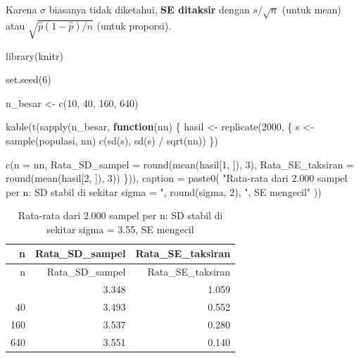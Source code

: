 \documentclass[
  indonesian,
  letterpaper,
]{book}
\newenvironment{Shaded}{\begin{snugshade}}{\end{snugshade}}
\newcommand{\AttributeTok}[1]{\textcolor[rgb]{0.40,0.45,0.13}{#1}}
\newcommand{\ControlFlowTok}[1]{\textcolor[rgb]{0.00,0.23,0.31}{\textbf{#1}}}
\newcommand{\DecValTok}[1]{\textcolor[rgb]{0.68,0.00,0.00}{#1}}
\newcommand{\FunctionTok}[1]{\textcolor[rgb]{0.28,0.35,0.67}{#1}}
\newcommand{\NormalTok}[1]{\textcolor[rgb]{0.00,0.23,0.31}{#1}}
\newcommand{\OtherTok}[1]{\textcolor[rgb]{0.00,0.23,0.31}{#1}}
\newcommand{\SpecialCharTok}[1]{\textcolor[rgb]{0.37,0.37,0.37}{#1}}
\newcommand{\StringTok}[1]{\textcolor[rgb]{0.13,0.47,0.30}{#1}}
\begin{document}
Karena \(\sigma\) biasanya tidak diketahui, \textbf{SE ditaksir} dengan
\(s/\sqrt{n}\) (untuk mean) atau \(\sqrt{\hat{p}(1-\hat{p})/n}\) (untuk
proporsi).

\begin{Shaded}
\begin{Highlighting}[]
\FunctionTok{library}\NormalTok{(knitr)}

\FunctionTok{set.seed}\NormalTok{(}\DecValTok{6}\NormalTok{)}

\NormalTok{n\_besar }\OtherTok{\textless{}{-}} \FunctionTok{c}\NormalTok{(}\DecValTok{10}\NormalTok{, }\DecValTok{40}\NormalTok{, }\DecValTok{160}\NormalTok{, }\DecValTok{640}\NormalTok{)}

\FunctionTok{kable}\NormalTok{(}\FunctionTok{t}\NormalTok{(}\FunctionTok{sapply}\NormalTok{(n\_besar, }\ControlFlowTok{function}\NormalTok{(nn) \{}
\NormalTok{  hasil }\OtherTok{\textless{}{-}} \FunctionTok{replicate}\NormalTok{(}\DecValTok{2000}\NormalTok{, \{}
\NormalTok{    s }\OtherTok{\textless{}{-}} \FunctionTok{sample}\NormalTok{(populasi, nn)}
    \FunctionTok{c}\NormalTok{(}\FunctionTok{sd}\NormalTok{(s), }\FunctionTok{sd}\NormalTok{(s) }\SpecialCharTok{/} \FunctionTok{sqrt}\NormalTok{(nn))}
\NormalTok{  \})}
  
  \FunctionTok{c}\NormalTok{(}\AttributeTok{n =}\NormalTok{ nn,}
    \AttributeTok{Rata\_SD\_sampel =} \FunctionTok{round}\NormalTok{(}\FunctionTok{mean}\NormalTok{(hasil[}\DecValTok{1}\NormalTok{, ]), }\DecValTok{3}\NormalTok{),}
    \AttributeTok{Rata\_SE\_taksiran =} \FunctionTok{round}\NormalTok{(}\FunctionTok{mean}\NormalTok{(hasil[}\DecValTok{2}\NormalTok{, ]), }\DecValTok{3}\NormalTok{))}
\NormalTok{\})), }
\AttributeTok{caption =} \FunctionTok{paste0}\NormalTok{(}
  \StringTok{"Rata{-}rata dari 2.000 sampel per n: SD stabil di sekitar sigma = "}\NormalTok{,}
  \FunctionTok{round}\NormalTok{(sigma, }\DecValTok{2}\NormalTok{),}
  \StringTok{", SE mengecil"}
\NormalTok{))}
\end{Highlighting}
\end{Shaded}

\begin{longtable}[]{@{}rrr@{}}
\caption{Rata-rata dari 2.000 sampel per n: SD stabil di sekitar sigma =
3.55, SE mengecil}\tabularnewline
\toprule\noalign{}
n & Rata\_SD\_sampel & Rata\_SE\_taksiran \\
\midrule\noalign{}
\endfirsthead
\toprule\noalign{}
n & Rata\_SD\_sampel & Rata\_SE\_taksiran \\
\midrule\noalign{}
\endhead
\bottomrule\noalign{}
\endlastfoot
10 & 3.348 & 1.059 \\
40 & 3.493 & 0.552 \\
160 & 3.537 & 0.280 \\
640 & 3.551 & 0.140 \\
\end{longtable}
\end{document}
